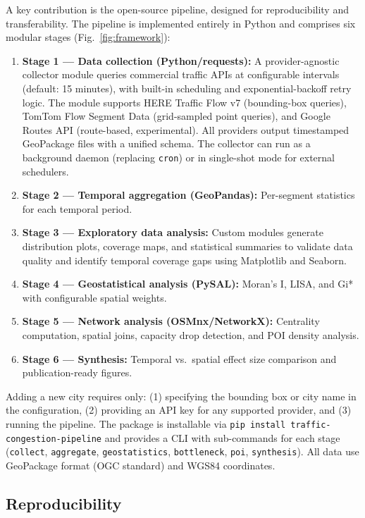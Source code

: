 \documentclass[preprint,12pt,authoryear]{elsarticle}
\begin{document}
A key contribution is the open-source pipeline, designed for reproducibility and transferability. The pipeline is implemented entirely in Python and comprises six modular stages (Fig.~\ref{fig:framework}):

\begin{enumerate}
\item \textbf{Stage 1 --- Data collection (Python/requests):} A provider-agnostic collector module queries commercial traffic APIs at configurable intervals (default: 15 minutes), with built-in scheduling and exponential-backoff retry logic. The module supports HERE Traffic Flow v7 (bounding-box queries), TomTom Flow Segment Data (grid-sampled point queries), and Google Routes API (route-based, experimental). All providers output timestamped GeoPackage files with a unified schema. The collector can run as a background daemon (replacing \texttt{cron}) or in single-shot mode for external schedulers.
\item \textbf{Stage 2 --- Temporal aggregation (GeoPandas):} Per-segment statistics for each temporal period.
\item \textbf{Stage 3 --- Exploratory data analysis:} Custom modules generate distribution plots, coverage maps, and statistical summaries to validate data quality and identify temporal coverage gaps using Matplotlib and Seaborn.
\item \textbf{Stage 4 --- Geostatistical analysis (PySAL):} Moran's I, LISA, and Gi* with configurable spatial weights.
\item \textbf{Stage 5 --- Network analysis (OSMnx/NetworkX):} Centrality computation, spatial joins, capacity drop detection, and POI density analysis.
\item \textbf{Stage 6 --- Synthesis:} Temporal vs.\ spatial effect size comparison and publication-ready figures.
\end{enumerate}

Adding a new city requires only: (1) specifying the bounding box or city name in the configuration, (2) providing an API key for any supported provider, and (3) running the pipeline. The package is installable via \texttt{pip install traffic-congestion-pipeline} and provides a CLI with sub-commands for each stage (\texttt{collect}, \texttt{aggregate}, \texttt{geostatistics}, \texttt{bottleneck}, \texttt{poi}, \texttt{synthesis}). All data use GeoPackage format (OGC standard) and WGS84 coordinates.

\subsection{Reproducibility}
\label{sec:reproducibility}
\end{document}

